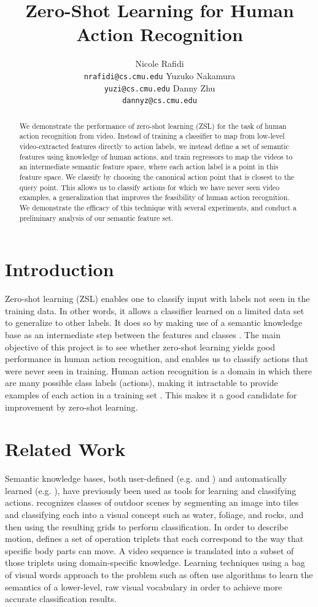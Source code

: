 \documentclass{article}
\title{Zero-Shot Learning for Human Action Recognition}
\author{Nicole Rafidi \\
  \texttt{nrafidi@cs.cmu.edu}
  \And
  Yuzuko Nakamura \\
  \texttt{yuzi@cs.cmu.edu}
  \And
  Danny Zhu \\
  \texttt{dannyz@cs.cmu.edu}
}
\begin{document}
\maketitle

\begin{abstract}
We demonstrate the performance of zero-shot learning (ZSL) for the task of human action recognition from video. Instead of training a classifier to map from low-level video-extracted features directly to action labels, we instead define a set of semantic features using knowledge of human actions, and train regressors to map the videos to an intermediate semantic feature space, where each action label is a point in this feature space. We classify by choosing the canonical action point that is closest to the query point. This allows us to classify actions for which we have never seen video examples, a generalization that improves the feasibility of human action recognition. We demonstrate the efficacy of this technique with several experiments, and conduct a preliminary analysis of our semantic feature set.
\end{abstract}

\section{Introduction}
Zero-shot learning (ZSL) enables one to classify input with labels not seen in the training data. In other words, it allows a classifier learned on a limited data set to generalize to other labels. It does so by making use of a semantic knowledge base as an intermediate step between the features and classes \cite{Palatucci09}. The main objective of this project is to see whether zero-shot learning yields good performance in human action recognition, and enables us to classify actions that were never seen in training. Human action recognition is a domain in which there are many possible class labels (actions), making it intractable to provide examples of each action in a training set \cite{Poppe10}. This makes it a good candidate for improvement by zero-shot learning.

\section{Related Work}
Semantic knowledge bases, both user-defined (e.g. \cite{Vogel07} and \cite{Park04}) and automatically learned (e.g. \cite{Zhao10}), have previously been used as tools for learning and classifying actions. \cite{Vogel07} recognizes classes of outdoor scenes by segmenting an image into tiles and classifying each into a visual concept such as water, foliage, and rocks, and then using the resulting grids to perform classification. In order to describe motion, \cite{Park04} defines a set of operation triplets that each correspond to the way that specific body parts can move. A video sequence is translated into a subset of those triplets using domain-specific knowledge. Learning techniques using a bag of visual words approach to the problem such as \cite{Zhao10} often use algorithms to learn the semantics of a lower-level, raw visual vocabulary in order to achieve more accurate classification results.
\end{document}
